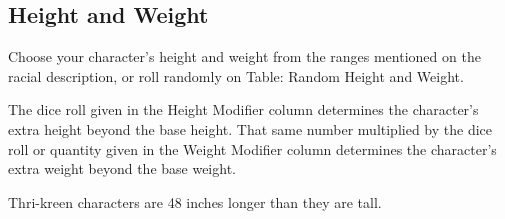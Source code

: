 \documentclass[10pt,a4paper,twocolumn]{d20}
\begin{document}
{

\subsection{Height and Weight}
Choose your character’s height and weight from the ranges mentioned on the racial description, or roll randomly on Table: Random Height and Weight.

The dice roll given in the Height Modifier column determines the character’s extra height beyond the base height. That same number multiplied by the dice roll or quantity given in the Weight Modifier column determines the character’s extra weight beyond the base weight.

Thri-kreen characters are 48 inches longer than they are tall.

}
\end{document}
